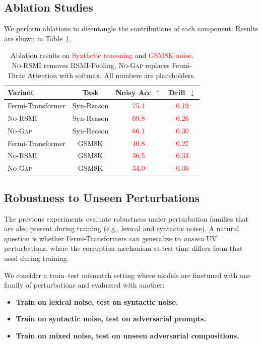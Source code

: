 \documentclass{article}
\newcommand{\TODO}[1]{\textcolor{red}{#1}}
\begin{document}
\subsection{Ablation Studies}

We perform ablations to disentangle the contributions of each component. Results are shown in Table~\ref{tab:ablation}.

\begin{table}[t]
    \centering
    \small
    \caption{
    Ablation results on \TODO{Synthetic reasoning} and \TODO{GSM8K-noise}. 
    \textsc{No-RSMI} removes RSMI-Pooling,
    \textsc{No-Gap} replaces Fermi-Dirac Attention with softmax.
    All numbers are placeholders.
    }
    \label{tab:ablation}
    \begin{tabular}{l c c c}
        \toprule
        Variant & Task & Noisy Acc $\uparrow$ & Drift $\downarrow$ \\
        \midrule
        Fermi-Transformer & Syn-Reason & \TODO{75.4} & \TODO{0.19} \\
        \textsc{No-RSMI} & Syn-Reason & \TODO{69.8} & \TODO{0.26} \\
        \textsc{No-Gap} & Syn-Reason & \TODO{66.1} & \TODO{0.30} \\
        \midrule
        Fermi-Transformer & GSM8K & \TODO{40.8} & \TODO{0.27} \\
        \textsc{No-RSMI} & GSM8K & \TODO{36.5} & \TODO{0.33} \\
        \textsc{No-Gap} & GSM8K & \TODO{34.0} & \TODO{0.36} \\
        \bottomrule
    \end{tabular}
\end{table}

\subsection{Robustness to Unseen Perturbations}

The previous experiments evaluate robustness under perturbation families that are also present during training (e.g., lexical and syntactic noise). A natural question is whether Fermi-Transformers can generalize to \emph{unseen} UV perturbations, where the corruption mechanism at test time differs from that used during training.

We consider a train--test mismatch setting where models are finetuned with one family of perturbations and evaluated with another:
\begin{itemize}[leftmargin=*]
    \item \textbf{Train on lexical noise, test on syntactic noise.}
    \item \textbf{Train on syntactic noise, test on adversarial prompts.}
    \item \textbf{Train on mixed noise, test on unseen adversarial compositions.}
\end{itemize}
\end{document}
